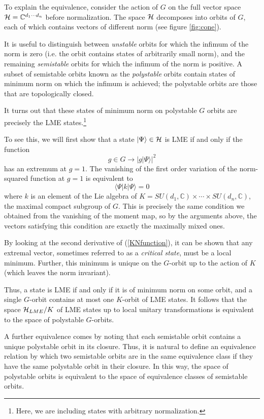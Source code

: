 \documentclass[12pt]{article}
\theoremstyle{definition}
\newcommand{\be}{\begin{equation}}
\newcommand{\ee}{\end{equation}}
\begin{document}
To explain the equivalence, consider the action of $G$ on the full vector space ${\cal H} = \mathbb{C}^{d_1 \cdots d_n}$ before normalization. The space ${\cal H}$ decomposes into orbits of $G$, each of which contains vectors of different norm (see figure \ref{fig:cone}).

It is useful to distinguish between {\it unstable} orbits for which the infimum of the norm is zero (i.e. the orbit contains states of arbitrarily small norm), and the remaining {\it semistable} orbits for which the infimum of the norm is positive. A subset of semistable orbits known as the {\it polystable} orbits contain states of minimum norm on which the infimum is achieved; the polystable orbits are those that are topologically closed.

It turns out that these states of minimum norm on polystable $G$ orbits are precisely the LME states.\footnote{Here, we are including states with arbitrary normalization.}

To see this, we will first show that a state $|\Psi \rangle \in {\cal H}$ is LME if and only if the function
\be
\label{KNfunction}
g \in G \to |g |\Psi \rangle|^2
\ee
has an extremum at $g=1$. The vanishing of the first order variation of the norm-squared function at $g=1$ is equivalent to
\be
\langle \Psi| k |\Psi \rangle = 0
\ee
where $k$ is an element of the Lie algebra of $K = SU(d_1,\mathbb{C}) \times \cdots \times SU(d_n, \mathbb{C})$, the maximal compact subgroup of $G$. This is precisely the same condition we obtained from the vanishing of the moment map, so by the arguments above, the vectors satisfying this condition are exactly the maximally mixed ones.

By looking at the second derivative of (\ref{KNfunction}), it can be shown that any extremal vector, sometimes referred to as a {\it critical state}, must be a local minimum.  Further, this minimum is unique on the $G$-orbit up to the action of $K$ (which leaves the norm invariant).

Thus, a state is LME if and only if it is of minimum norm on some orbit, and a single $G$-orbit contains at most one $K$-orbit of LME states. It follows that the space ${\cal H}_{LME}/K$ of LME states up to local unitary transformations is equivalent to the space of polystable $G$-orbits.

A further equivalence comes by noting that each semistable orbit contains a unique polystable orbit in its closure. Thus, it is natural to define an equivalence relation by which two semistable orbits are in the same equivalence class if they have the same polystable orbit in their closure. In this way, the space of polystable orbits is equivalent to the space of equivalence classes of semistable orbits.
\end{document}
